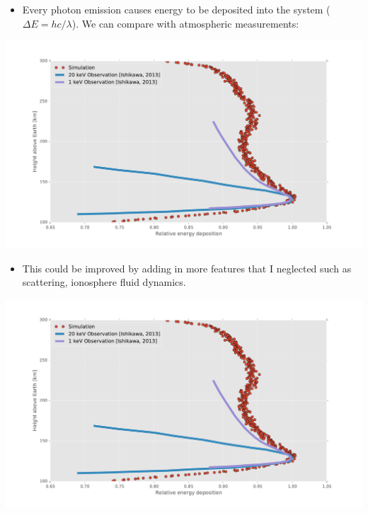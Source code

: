 \documentclass[xcolor=pdftex,dvipsnames,table,usenames,11pt]{beamer}
\begin{document}
\begin{frame}
  \begin{itemize}
  \item Every photon emission causes energy to be deposited into the system ($\Delta E = hc/\lambda$). We can compare with atmospheric measurements:
  \end{itemize}
\begin{center}
\includegraphics[width=\textwidth]{img/energy_deposition.pdf}
\end{center}
\end{frame}




\begin{frame}
  \begin{itemize}
  \item This could be improved by adding in more features that I neglected such as scattering, ionosphere fluid dynamics.
  \end{itemize}
\begin{center}
\includegraphics[width=\textwidth]{img/energy_deposition.pdf}
\end{center}
\end{frame}
\end{document}
